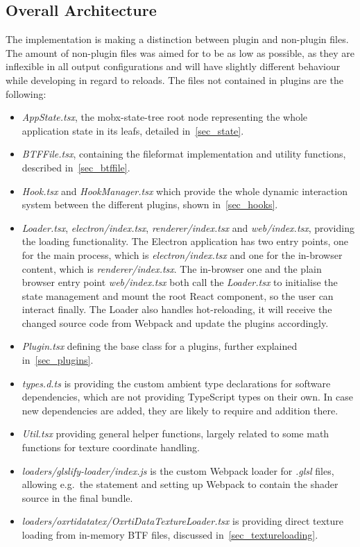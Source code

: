 \subsection{Overall Architecture}
The implementation is making a distinction between plugin and non-plugin files.
The amount of non-plugin files was aimed for to be as low as possible, as they
are inflexible in all output configurations and will have slightly different
behaviour while developing in regard to reloads. The files not contained in
plugins are the following:
\begin{itemize}
\item \emph{AppState.tsx}, the mobx-state-tree root node representing the whole
  application state in its leafs, detailed in~\autoref{sec_state}.
 \item \emph{BTFFile.tsx}, containing the fileformat implementation and utility
   functions, described in~\autoref{sec_btffile}.
\item \emph{Hook.tsx} and \emph{HookManager.tsx} which provide the whole dynamic
  interaction system between the different plugins, shown
  in~\autoref{sec_hooks}.
\item \emph{Loader.tsx}, \emph{electron/index.tsx}, \emph{renderer/index.tsx}
  and \emph{web/index.tsx}, providing the loading functionality. The Electron
  application has two entry points, one for the main process, which is
  \emph{electron/index.tsx} and one for the in-browser content, which is
  \emph{renderer/index.tsx}. The in-browser one and the plain browser entry point
  \emph{web/index.tsx} both call the \emph{Loader.tsx} to initialise the state
  management and mount the root React component, so the user can interact
  finally. The Loader also handles hot-reloading, it will receive the changed
  source code from Webpack and update the plugins accordingly.
 \item \emph{Plugin.tsx} defining the base class for a plugins, further
   explained in~\autoref{sec_plugins}.
\item \emph{types.d.ts} is providing the custom ambient type declarations for
  software dependencies, which are not providing TypeScript types on their own.
  In case new dependencies are added, they are likely to require and addition there.
\item \emph{Util.tsx} providing general helper functions, largely related to
  some math functions for texture coordinate handling.
\item \emph{loaders/glslify-loader/index.js} is the custom Webpack loader for
  \emph{.glsl} files, allowing e.g.\ the  statement and setting up Webpack to contain the shader source
  in the final bundle.
\item \emph{loaders/oxrtidatatex/OxrtiDataTextureLoader.tsx} is providing direct
  texture loading from in-memory BTF files, discussed in~\autoref{sec_textureloading}.
\end{itemize}

